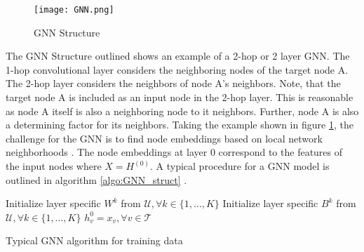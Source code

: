 	\begin{figure}
		\centering
		\texttt{[image: GNN.png]}
		\caption{GNN Structure}
		\cite{leskovec2021lecture}
		\label{fig:GNN_structure}
	\end{figure}


	\noindent The GNN Structure outlined shows an example of a 2-hop or 2 layer GNN. 
	The 1-hop convolutional layer considers the neighboring nodes of the target node A. 
	The 2-hop layer considers the neighbors of node A's neighbors. Note, that the 
	target node A is included as an input node in the 2-hop layer. This is reasonable 
	as node A itself is also a neighboring node to it neighbors. Further, node 
	A is also a determining factor for its neighbors. Taking the example shown in
	figure \ref{fig:GNN_structure}, the challenge for the GNN is to find node
	embeddings based on local network neighborhoods
	\citep{leskovec2021lecture}. The node embeddings at layer 0 correspond to
	the features of the input nodes where $X = H^{(0)}$. A typical procedure
	for a GNN model is outlined in algorithm \ref{algo:GNN_struct}
	\citep{hamilton2017inductive,leskovec2021lecture,you2020design}.
	

	\begin{algorithm}
		\scriptsize
		\SetAlgoLined
		\nl Initialize layer specific $W^{k}$ from $\mathcal{U},\forall k \in 
			\{1,\dots,K\}$\;
		\nl Initialize layer specific $B^{k}$ from $\mathcal{U},\forall k \in
			\{1,\dots,K\}$\;
		\nl $h_{v}^{0} = x_{v},\forall v \in \mathcal{T}$\\
		\nl {}
		\caption{Typical GNN algorithm for training data}
		\label{algo:GNN_struct}
	\end{algorithm}


